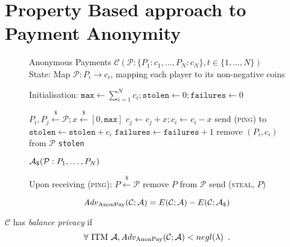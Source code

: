 \section{Property Based approach to Payment Anonymity}
  \label{sec:pay-anon-game}
  \begin{figure}[H]
    \begin{gamebox}{Anonymous Payments $\mathcal{C}(\mathcal{P}: \{P_1: c_1,
    \dots, P_N: c_N\}, t \in \{1, \dots, N\})$}
      State: Map $\mathcal{P}: P_i \rightarrow c_i$, mapping each player to its
      non-negative coins

      Initialisation: $\mathtt{max} \gets \sum\limits_{i = 1}^N c_i;
      \mathtt{stolen} \gets 0; \mathtt{failures} \gets 0$

      \begin{algorithmic}[1]
          \State $P_i, P_j \overset{\$}{\gets} \mathcal{P}; x
          \overset{\$}{\gets} [0, \mathtt{max}]$
            \State $c_j \gets c_j + x; c_i \gets c_i - x$
          \EndIf
          \State send (\textsc{ping}) to \adversary
            \State $\mathtt{stolen} \gets \mathtt{stolen} + c_i$
            \State $\mathtt{failures} \gets \mathtt{failures} + 1$
            \State remove $(P_i, c_i)$ from $\mathcal{P}$
          \EndIf
        \EndWhile
        \State \Return \texttt{stolen}
      \end{algorithmic}
    \end{gamebox}
    \caption{}
  \end{figure}

  \begin{figure}[H]
    \begin{simulatorbox}{$\mathcal{A}_{\$}(\mathcal{P}: P_1, \dots, P_N)$}
      \begin{algorithmic}[1]
        \State Upon receiving (\textsc{ping}): 
        \Indent
          \State $P \overset{\$}{\gets} \mathcal{P}$
          \State remove $P$ from $\mathcal{P}$
          \State send (\textsc{steal}, $P$)
        \EndIndent
      \end{algorithmic}
    \end{simulatorbox}
    \caption{}
  \end{figure}

  \begin{definition}
    \begin{equation*}
      \mathit{Adv}_{\mathrm{AnonPay}}(\mathcal{C}; \mathcal{A}) = E(\mathcal{C};
      \mathcal{A}) - E(\mathcal{C}; \mathcal{A}_{\$})
    \end{equation*}
  \end{definition}

  \begin{definition}
    $\mathcal{C}$ has \emph{balance privacy} if
    \begin{equation*}
      \forall \text{ ITM } \mathcal{A},
      \mathit{Adv}_{\mathrm{AnonPay}}(\mathcal{C}; \mathcal{A}) < negl(\lambda)
      \enspace.
    \end{equation*}
  \end{definition}
